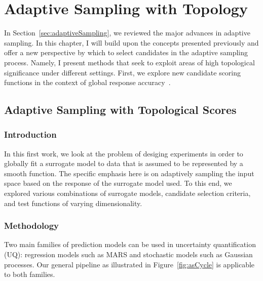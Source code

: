 
\chapter{Adaptive Sampling with Topology}
\label{ch:adaptiveSampling}

In Section~\ref{sec:adaptiveSampling}, we reviewed the major advances in adaptive sampling.
%
In this chapter, I will build upon the concepts presented previously and offer a new perspective by which to select candidates in the adaptive sampling process.
%
Namely, I present methods that seek to exploit areas of high topological significance under different settings.
%
First, we explore new candidate scoring functions in the context of global response accuracy~\cite{MaljovecWangKupresanin2013}.
%

\section{Adaptive Sampling with Topological Scores}
\label{paper:ijuq2013}

\subsection{Introduction}

In this first work, we look at the problem of desiging experiments in order to globally fit a surrogate model to data that is assumed to be represented by a smooth function.
%
The specific emphasis here is on adaptively sampling the input space based on the response of the surrogate model used.
%
To this end, we explored various combinations of surrogate models, candidate selection criteria, and test functions of varying dimensionality.

\subsection{Methodology}

Two main families of prediction models can be used in uncertainty quantification (UQ): regression models such as MARS and stochastic models such as Gaussian processes.
%
Our general pipeline as illustrated in Figure~\ref{fig:asCycle} is applicable to both families.

